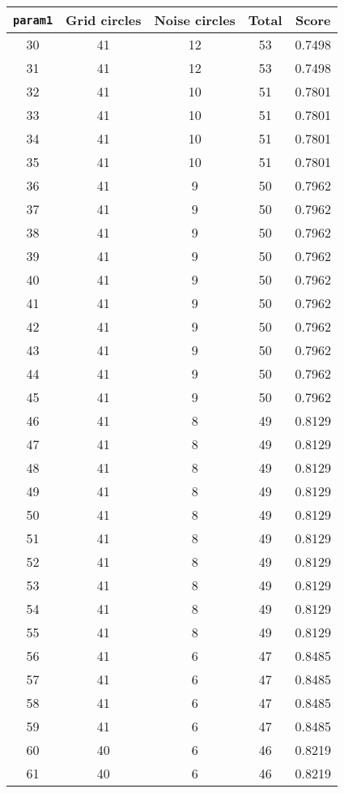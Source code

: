 \documentclass[letterpaper, 12pt]{article}
\begin{document}
\begin{longtable}{|c|c|c|c|c|}
\hline
\textbf{\texttt{param1}} & \textbf{Grid circles} & \textbf{Noise circles} & \textbf{Total} & \textbf{Score} \\
\hline
30 & 41 & 12 & 53 & 0.7498 \\
\hline
31 & 41 & 12 & 53 & 0.7498 \\
\hline
32 & 41 & 10 & 51 & 0.7801 \\
\hline
33 & 41 & 10 & 51 & 0.7801 \\
\hline
34 & 41 & 10 & 51 & 0.7801 \\
\hline
35 & 41 & 10 & 51 & 0.7801 \\
\hline
36 & 41 & 9 & 50 & 0.7962 \\
\hline
37 & 41 & 9 & 50 & 0.7962 \\
\hline
38 & 41 & 9 & 50 & 0.7962 \\
\hline
39 & 41 & 9 & 50 & 0.7962 \\
\hline
40 & 41 & 9 & 50 & 0.7962 \\
\hline
41 & 41 & 9 & 50 & 0.7962 \\
\hline
42 & 41 & 9 & 50 & 0.7962 \\
\hline
43 & 41 & 9 & 50 & 0.7962 \\
\hline
44 & 41 & 9 & 50 & 0.7962 \\
\hline
45 & 41 & 9 & 50 & 0.7962 \\
\hline
46 & 41 & 8 & 49 & 0.8129 \\
\hline
47 & 41 & 8 & 49 & 0.8129 \\
\hline
48 & 41 & 8 & 49 & 0.8129 \\
\hline
49 & 41 & 8 & 49 & 0.8129 \\
\hline
50 & 41 & 8 & 49 & 0.8129 \\
\hline
51 & 41 & 8 & 49 & 0.8129 \\
\hline
52 & 41 & 8 & 49 & 0.8129 \\
\hline
53 & 41 & 8 & 49 & 0.8129 \\
\hline
54 & 41 & 8 & 49 & 0.8129 \\
\hline
55 & 41 & 8 & 49 & 0.8129 \\
\hline
56 & 41 & 6 & 47 & 0.8485 \\
\hline
57 & 41 & 6 & 47 & 0.8485 \\
\hline
58 & 41 & 6 & 47 & 0.8485 \\
\hline
59 & 41 & 6 & 47 & 0.8485 \\
\hline
60 & 40 & 6 & 46 & 0.8219 \\
\hline
61 & 40 & 6 & 46 & 0.8219 \\

\end{longtable}
\end{document}
